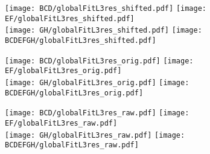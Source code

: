 \documentclass[landscape,10pt]{beamer} %
\begin{document}


\newpage

\begin{figure}[p]
\centering
  \texttt{[image: BCD/globalFitL3res\_shifted.pdf]}
  \texttt{[image: EF/globalFitL3res\_shifted.pdf]}\\
  \texttt{[image: GH/globalFitL3res\_shifted.pdf]}
  \texttt{[image: BCDEFGH/globalFitL3res\_shifted.pdf]}
\end{figure}

\newpage 

\begin{figure}[p]
\centering
  \texttt{[image: BCD/globalFitL3res\_orig.pdf]}
  \texttt{[image: EF/globalFitL3res\_orig.pdf]}\\
  \texttt{[image: GH/globalFitL3res\_orig.pdf]}
  \texttt{[image: BCDEFGH/globalFitL3res\_orig.pdf]}
\end{figure}

\newpage

\begin{figure}[p]
\centering
  \texttt{[image: BCD/globalFitL3res\_raw.pdf]}
  \texttt{[image: EF/globalFitL3res\_raw.pdf]}\\
  \texttt{[image: GH/globalFitL3res\_raw.pdf]}
  \texttt{[image: BCDEFGH/globalFitL3res\_raw.pdf]}
\end{figure}
\end{document}
